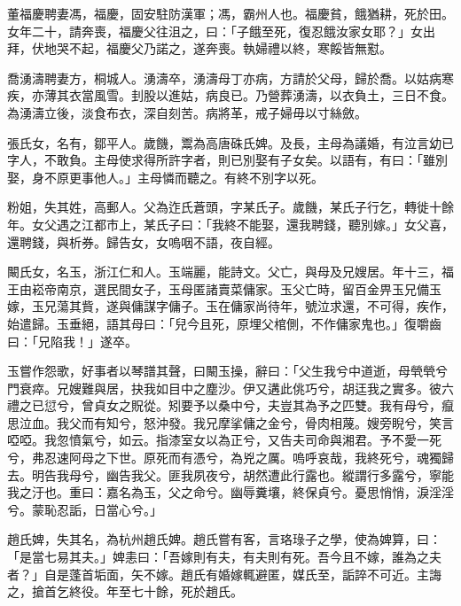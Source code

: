 \begin{pinyinscope}
董福慶聘妻馮，福慶，固安駐防漢軍；馮，霸州人也。福慶貧，餓猶耕，死於田。女年二十，請奔喪，福慶父往沮之，曰：「子餓至死，復忍餓汝家女耶？」女出拜，伏地哭不起，福慶父乃諾之，遂奔喪。執婦禮以終，寒餒皆無懟。

喬湧濤聘妻方，桐城人。湧濤卒，湧濤母丁亦病，方請於父母，歸於喬。以姑病寒疾，亦薄其衣當風雪。刲股以進姑，病良已。乃營葬湧濤，以衣負土，三日不食。為湧濤立後，淡食布衣，深自刻苦。病將革，戒子婦毋以寸絲斂。

張氏女，名有，鄒平人。歲饑，鬻為高唐硃氏婢。及長，主母為議婚，有泣言幼已字人，不敢負。主母使求得所許字者，則已別娶有子女矣。以語有，有曰：「雖別娶，身不原更事他人。」主母憐而聽之。有終不別字以死。

粉姐，失其姓，高郵人。父為迮氏蒼頭，字某氏子。歲饑，某氏子行乞，轉徙十餘年。女父遇之江都市上，某氏子曰：「我終不能娶，還我聘錢，聽別嫁。」女父喜，還聘錢，與析券。歸告女，女嗚咽不語，夜自經。

闞氏女，名玉，浙江仁和人。玉端麗，能詩文。父亡，與母及兄嫂居。年十三，福王由崧帝南京，選民間女子，玉母匿諸賣菜傭家。玉父亡時，留百金畀玉兄備玉嫁，玉兄蕩其貲，遂與傭謀字傭子。玉在傭家尚待年，號泣求還，不可得，疾作，始遣歸。玉垂絕，語其母曰：「兒今且死，原埋父棺側，不作傭家鬼也。」復嚼齒曰：「兄陷我！」遂卒。

玉嘗作怨歌，好事者以琴譜其聲，曰闞玉操，辭曰：「父生我兮中道逝，母煢煢兮門衰瘁。兄嫂難與居，抉我如目中之塵沙。伊又遘此佻巧兮，胡迋我之實多。彼六禮之已愆兮，曾貞女之貺從。矧要予以桑中兮，夫豈其為予之匹雙。我有母兮，癙思泣血。我父而有知兮，怒沖發。我兄摩挲傭之金兮，骨肉相蔑。嫂旁睨兮，笑言啞啞。我忽憤氣兮，如云。指漆室女以為正兮，又告夫司命與湘君。予不愛一死兮，弗忍速阿母之下世。原死而有憑兮，為兇之厲。嗚呼哀哉，我終死兮，魂獨歸去。明告我母兮，幽告我父。匪我夙夜兮，胡然遭此行露也。縱謂行多露兮，寧能我之汙也。重曰：嘉名為玉，父之命兮。幽辱糞壤，終保貞兮。憂思悄悄，淚淫淫兮。蒙恥忍詬，日當心兮。」

趙氏婢，失其名，為杭州趙氏婢。趙氏嘗有客，言珞琭子之學，使為婢算，曰：「是當七易其夫。」婢恚曰：「吾嫁則有夫，有夫則有死。吾今且不嫁，誰為之夫者？」自是蓬首垢面，矢不嫁。趙氏有婚嫁輒避匿，媒氏至，詬誶不可近。主誨之，搶首乞終役。年至七十餘，死於趙氏。


\end{pinyinscope}